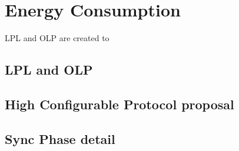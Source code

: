 \chapter{Energy Consumption}

LPL and OLP are created to 
\section{\ac{LPL} and \ac{OLP}}

\section{High Configurable Protocol proposal}

\section{Sync Phase detail}
